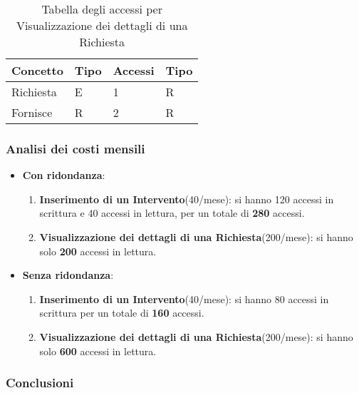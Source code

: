 \documentclass{article}
\begin{document}
\begin{table}[h!]
    \centering
    \begin{adjustbox}{width=0.6\textwidth}
        \begin{tabular}{|m{2cm}|m{2cm}|m{2cm}|m{2cm}|}
            \hline  
            \textbf{Concetto} & \textbf{Tipo} & \textbf{Accessi} & \textbf{Tipo}\\ 
            \hline
            Richiesta & E & 1 & R\\
            \hline
            Fornisce & R & 2 & R\\
            \hline
        \end{tabular}
    \end{adjustbox}
    \caption{Tabella degli accessi per Visualizzazione dei dettagli di una Richiesta}
    \label{tab:accesstable8}
\end{table}

\subsubsection{Analisi dei costi mensili}

\begin{itemize}
    \item \textbf{Con ridondanza}:
    \begin{enumerate}
        \item \textbf{Inserimento di un Intervento}(40/mese): si hanno 120 accessi in scrittura e 40 accessi in lettura, per un totale di \textbf{280} accessi.
        \item \textbf{Visualizzazione dei dettagli di una Richiesta}(200/mese): si hanno solo \textbf{200} accessi in lettura.
    \end{enumerate}
    \item \textbf{Senza ridondanza}:
    \begin{enumerate}
        \item \textbf{Inserimento di un Intervento}(40/mese): si hanno 80 accessi in scrittura per un totale di \textbf{160} accessi.
        \item \textbf{Visualizzazione dei dettagli di una Richiesta}(200/mese): si hanno solo \textbf{600} accessi in lettura.
    \end{enumerate}
\end{itemize}

\subsubsection{Conclusioni}
\end{document}
